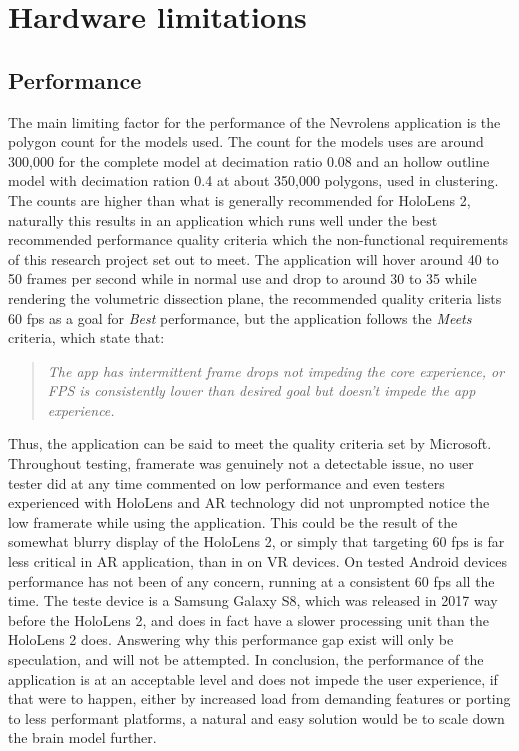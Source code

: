\section{Hardware limitations}

\subsection{Performance}\label{chap:discussperformance}

The main limiting factor for the performance of the Nevrolens application is the polygon count for the models used. The count for the models uses are around 300,000 for the complete model at decimation ratio 0.08 and an hollow outline model with decimation ration 0.4 at about 350,000 polygons, used in clustering. The counts are higher than what is generally recommended for HoloLens 2, naturally this results in an application which runs well under the best recommended performance quality criteria which the non-functional requirements of this research project set out to meet. The application will hover around 40 to 50 frames per second while in normal use and drop to around 30 to 35 while rendering the volumetric dissection plane, the recommended quality criteria lists 60 fps as a goal for \textit{Best} performance, but the application follows the \textit{Meets} criteria, which state that:
\begin{quote}
\textit{The app has intermittent frame drops not impeding the core experience, or FPS is consistently lower than desired goal but doesn’t impede the app experience.}
\end{quote}
Thus, the application can be said to meet the quality criteria set by Microsoft. 
Throughout testing, framerate was genuinely not a detectable issue, no user tester did at any time commented on low performance and even testers experienced with HoloLens and AR technology did not unprompted notice the low framerate while using the application. This could be the result of the somewhat blurry display of the HoloLens 2, or simply that targeting 60 fps is far less critical in AR application, than in on VR devices. 
On tested Android devices performance has not been of any concern, running at a consistent 60 fps all the time. The teste device is a Samsung Galaxy S8, which was released in 2017 way before the HoloLens 2, and does in fact have a slower processing unit than the HoloLens 2 does. Answering why this performance gap exist will only be speculation, and will not be attempted.
In conclusion, the performance of the application is at an acceptable level and does not impede the user experience, if that were to happen, either by increased load from demanding features or porting to less performant platforms, a natural and easy solution would be to scale down the brain model further.



